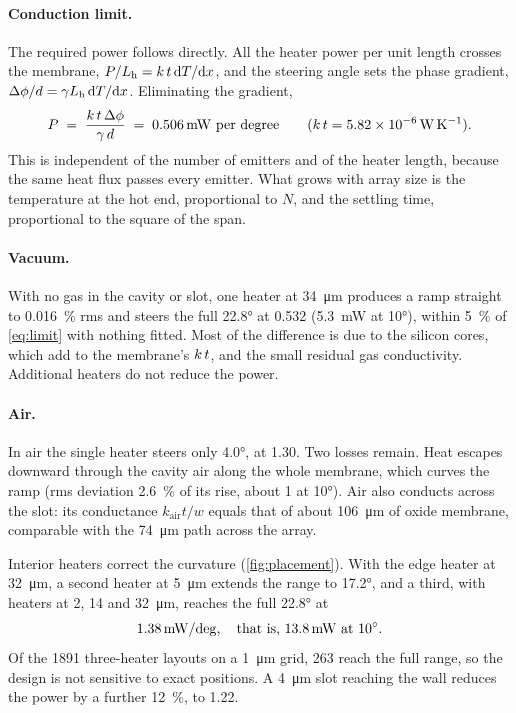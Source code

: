 \paragraph{Conduction limit.} The required power follows directly. All the heater power per unit length crosses the
membrane, $P/L_{\mathrm{h}}=k\,t\,\mathrm{d} T/\mathrm{d} x$, and the steering angle sets the phase gradient,
$\Delta\phi/d=\gamma L_{\mathrm{h}}\,\mathrm{d} T/\mathrm{d} x$. Eliminating the gradient,
\begin{equation}
  P \;=\; \frac{\kt\,\Delta\phi}{\gamma\,d} \;=\; \qty{0.506}{\milli\watt}\ \text{per degree}
  \qquad(\kt=\qty{5.82e-6}{\watt\per\kelvin}).
  \label{eq:limit}
\end{equation}
This is independent of the number of emitters and of the heater length, because the same heat flux passes every
emitter. What grows with array size is the temperature at the hot end, proportional to $N$, and the settling time,
proportional to the square of the span.

\paragraph{Vacuum.} With no gas in the cavity or slot, one heater at \qty{34}{\micro\metre} produces a ramp straight
to \qty{0.016}{\percent} rms and steers the full \ang{22.8} at \qty{0.532}{\mWdeg} (\qty{5.3}{\milli\watt} at
\ang{10}), within \qty{5}{\percent} of \cref{eq:limit} with nothing fitted. Most of the difference is due to the
silicon cores, which add to the membrane's $k\,t$, and the small residual gas conductivity. Additional heaters do not
reduce the power.

\paragraph{Air.} In air the single heater steers only \ang{4.0}, at \qty{1.30}{\mWdeg}. Two losses remain. Heat
escapes downward through the cavity air along the whole membrane, which curves the ramp (rms deviation
\qty{2.6}{\percent} of its rise, about \qty{1}{\rad} at \ang{10}). Air also conducts across the slot: its conductance
$k_\mathrm{air}t/w$ equals that of about \qty{106}{\micro\metre} of oxide membrane, comparable with the
\qty{74}{\micro\metre} path across the array.

Interior heaters correct the curvature (\cref{fig:placement}). With the edge heater at \qty{32}{\micro\metre}, a
second heater at \qty{5}{\micro\metre} extends the range to \ang{17.2}, and a third, with heaters at 2, 14 and
\qty{32}{\micro\metre}, reaches the full \ang{22.8} at
\begin{equation}
  \qty{1.38}{\milli\watt\per\deg}, \quad\text{that is, } \qty{13.8}{\milli\watt}\ \text{at}\ \ang{10}.
\end{equation}
Of the \num{1891} three-heater layouts on a \qty{1}{\micro\metre} grid, \num{263} reach the full range, so the design
is not sensitive to exact positions. A \qty{4}{\micro\metre} slot reaching the wall reduces the power by a further
\qty{12}{\percent}, to \qty{1.22}{\mWdeg}.

